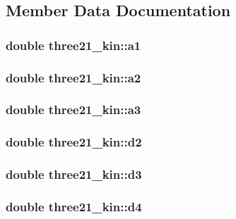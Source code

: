 \subsection{Member Data Documentation}
\hypertarget{structthree21__kin_a45aab53e691d71c6a7c66458c7306a54}{
\subsubsection[{a1}]{\setlength{\rightskip}{0pt plus 5cm}double three21\-\_\-kin\-::a1}}\label{structthree21__kin_a45aab53e691d71c6a7c66458c7306a54}
\hypertarget{structthree21__kin_aadc281e22d245e3ea7d0ab32a6763909}{
\subsubsection[{a2}]{\setlength{\rightskip}{0pt plus 5cm}double three21\-\_\-kin\-::a2}}\label{structthree21__kin_aadc281e22d245e3ea7d0ab32a6763909}
\hypertarget{structthree21__kin_a7c7854d400f02a38c79ac5c93c675fab}{
\subsubsection[{a3}]{\setlength{\rightskip}{0pt plus 5cm}double three21\-\_\-kin\-::a3}}\label{structthree21__kin_a7c7854d400f02a38c79ac5c93c675fab}
\hypertarget{structthree21__kin_acc548b9be80794aa0a1a452943948dd8}{
\subsubsection[{d2}]{\setlength{\rightskip}{0pt plus 5cm}double three21\-\_\-kin\-::d2}}\label{structthree21__kin_acc548b9be80794aa0a1a452943948dd8}
\hypertarget{structthree21__kin_acec9cbbe4c2e53b5b56530b12ab01627}{
\subsubsection[{d3}]{\setlength{\rightskip}{0pt plus 5cm}double three21\-\_\-kin\-::d3}}\label{structthree21__kin_acec9cbbe4c2e53b5b56530b12ab01627}
\hypertarget{structthree21__kin_a8b7938d9df9ce3a8a3bf58fb2c27b119}{
\subsubsection[{d4}]{\setlength{\rightskip}{0pt plus 5cm}double three21\-\_\-kin\-::d4}}\label{structthree21__kin_a8b7938d9df9ce3a8a3bf58fb2c27b119}
